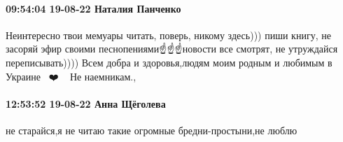  
 
 
 
 

\paragraph{09:54:04 19-08-22 Наталия Панченко}

Неинтересно твои мемуары читать, поверь, никому здесь))) пиши книгу, не засоряй
эфир своими песнопениями☝️☝️☝️новости все смотрят, не утруждайся переписывать))))
Всем добра и здоровья,людям моим родным и любимым в Украине🥰🥰🥰❤️🤗🤗🤗 Не
наемникам.,

\paragraph{12:53:52 19-08-22 Анна Щёголева}

не старайся,я не читаю такие огромные бредни-простыни,не люблю
